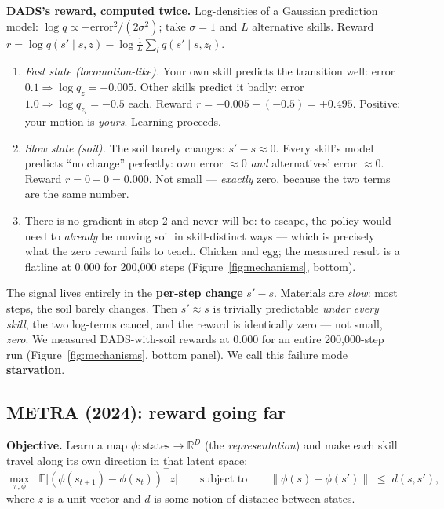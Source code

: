 \documentclass[11pt,a4paper]{article}
\begin{document}
\begin{worked}
\textbf{DADS's reward, computed twice.} Log-densities of a Gaussian prediction
model: $\log q \propto -\text{error}^2 / (2\sigma^2)$; take $\sigma = 1$ and
$L$ alternative skills. Reward $r = \log q(s' \mid s, z) - \log
\frac{1}{L}\sum_l q(s' \mid s, z_l)$.
\begin{enumerate}[leftmargin=6mm, itemsep=0mm]
\item \emph{Fast state (locomotion-like).} Your own skill predicts the
transition well: error $0.1 \Rightarrow \log q_z = -0.005$. Other skills
predict it badly: error $1.0 \Rightarrow \log q_{z_l} = -0.5$ each. Reward
$r = -0.005 - (-0.5) = \mathbf{+0.495}$. Positive: your motion is
\emph{yours}. Learning proceeds.
\item \emph{Slow state (soil).} The soil barely changes: $s' - s \approx 0$.
Every skill's model predicts ``no change'' perfectly: own error $\approx 0$
\emph{and} alternatives' error $\approx 0$. Reward
$r = 0 - 0 = \mathbf{0.000}$. Not small --- \emph{exactly} zero, because the
two terms are the same number.
\item There is no gradient in step 2 and never will be: to escape, the policy
would need to \emph{already} be moving soil in skill-distinct ways --- which
is precisely what the zero reward fails to teach. Chicken and egg; the
measured result is a flatline at $0.000$ for 200{,}000 steps
(Figure~\ref{fig:mechanisms}, bottom).
\end{enumerate}
\end{worked}

\begin{pitfall}
The signal lives entirely in the \textbf{per-step change} $s' - s$. Materials
are \emph{slow}: most steps, the soil barely changes. Then $s' \approx s$ is
trivially predictable \emph{under every skill}, the two log-terms cancel, and the
reward is identically zero --- not small, \emph{zero}. We measured DADS-with-soil
rewards at $0.000$ for an entire 200{,}000-step run
(Figure~\ref{fig:mechanisms}, bottom panel). We call this failure mode
\textbf{starvation}.
\end{pitfall}

\subsection{METRA (2024): reward going far}

\textbf{Objective.} Learn a map $\phi \colon \text{states} \to \mathbb{R}^D$
(the \emph{representation}) and make each skill travel along its own direction in
that latent space:
\begin{equation}
\max_{\pi, \phi} \;\; \mathbb{E}\big[ (\phi(s_{t+1}) - \phi(s_t))^{\!\top} z \big]
\qquad \text{subject to} \qquad
\|\phi(s) - \phi(s')\| \;\le\; d(s, s') ,
\label{eq:metra}
\end{equation}
where $z$ is a unit vector and $d$ is some notion of distance between states.
\end{document}
